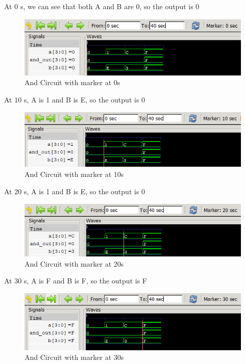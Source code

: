 \documentclass[12pt]{article}
\begin{document}
At 0 s, we can see that both A and B are 0, so the output is 0
\begin{figure}[h]
    \centering
    \includegraphics[width = 1.0\textwidth]{figs/And0.png}
    \caption{And Circuit with marker at 0s}
    \label{fig:enter-label}
\end{figure}

At 10 s, A is 1 and B is E, so the output is 0
\begin{figure}[h]
    \centering
    \includegraphics[width = 1.0\textwidth]{figs/And10.png}
    \caption{And Circuit with marker at 10s}
    \label{fig:enter-label}
\end{figure}


At 20 s, A is 1 and B is E, so the output is 0
\begin{figure}[h]
    \centering
    \includegraphics[width = 1.0\textwidth]{figs/And20.png}
    \caption{And Circuit with marker at 20s}
    \label{fig:enter-label}
\end{figure}


\newpage


At 30 s, A is F and B is F, so the output is F
\begin{figure}[h]
    \centering
    \includegraphics[width = 1.0\textwidth]{figs/And30.png}
    \caption{And Circuit with marker at 30s}
    \label{fig:enter-label}
\end{figure}
\end{document}

